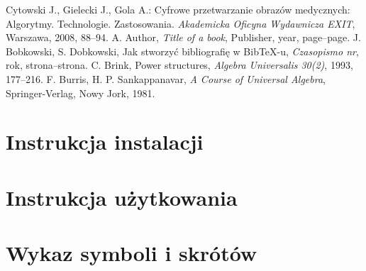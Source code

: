 \documentclass[a4paper,11pt,twoside]{report}
\theoremstyle{definition}
\begin{document}
\begin{thebibliography}{20}%
{}

 Cytowski J., Gielecki J., Gola A.: Cyfrowe przetwarzanie obrazów medycznych: Algorytmy. Technologie. Zastosowania. \emph{Akademicka Oficyna Wydawnicza EXIT}, Warszawa, 2008, 88--94. 
 A. Author, \emph{Title of a book}, Publisher, year, page--page.
 J. Bobkowski, S. Dobkowski, Jak stworzyć bibliografię w BibTeX-u, \emph{Czasopismo nr}, rok, strona--strona.
 C. Brink, Power structures, \emph{Algebra Universalis 30(2)}, 1993, 177--216.
 F. Burris, H. P. Sankappanavar, \emph{A Course of Universal Algebra}, Springer-Verlag, Nowy Jork, 1981.
\end{thebibliography}





\chapter*{Instrukcja instalacji}





\chapter*{Instrukcja użytkowania}



\chapter*{Wykaz symboli i skrótów}
\end{document}
